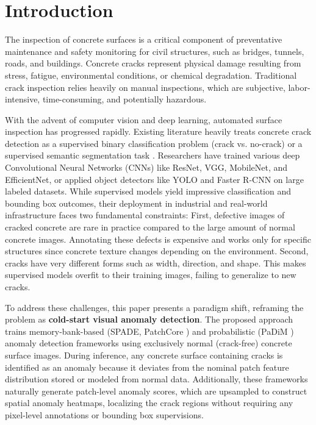 \documentclass[runningheads]{llncs}
\begin{document}
\section{Introduction}
\label{sec:introduction}

The inspection of concrete surfaces is a critical component of preventative maintenance and safety monitoring for civil structures, such as bridges, tunnels, roads, and buildings. Concrete cracks represent physical damage resulting from stress, fatigue, environmental conditions, or chemical degradation. Traditional crack inspection relies heavily on manual inspections, which are subjective, labor-intensive, time-consuming, and potentially hazardous. 

With the advent of computer vision and deep learning, automated surface inspection has progressed rapidly. Existing literature heavily treats concrete crack detection as a supervised binary classification problem (crack vs. no-crack) or a supervised semantic segmentation task \cite{Cha2017DeepLC,Golding2022CrackDI,liu2019computer}. Researchers have trained various deep Convolutional Neural Networks (CNNs) like ResNet, VGG, MobileNet, and EfficientNet, or applied object detectors like YOLO and Faster R-CNN on large labeled datasets. While supervised models yield impressive classification and bounding box outcomes, their deployment in industrial and real-world infrastructure faces two fundamental constraints:
First, defective images of cracked concrete are rare in practice compared to the large amount of normal concrete images. Annotating these defects is expensive and works only for specific structures since concrete texture changes depending on the environment. Second, cracks have very different forms such as width, direction, and shape. This makes supervised models overfit to their training images, failing to generalize to new cracks.

To address these challenges, this paper presents a paradigm shift, reframing the problem as \textbf{cold-start visual anomaly detection}. The proposed approach trains memory-bank-based (SPADE, PatchCore \cite{roth2022towards}) and probabilistic (PaDiM \cite{defard2021padim}) anomaly detection frameworks using exclusively normal (crack-free) concrete surface images. During inference, any concrete surface containing cracks is identified as an anomaly because it deviates from the nominal patch feature distribution stored or modeled from normal data. Additionally, these frameworks naturally generate patch-level anomaly scores, which are upsampled to construct spatial anomaly heatmaps, localizing the crack regions without requiring any pixel-level annotations or bounding box supervisions. 
\end{document}
